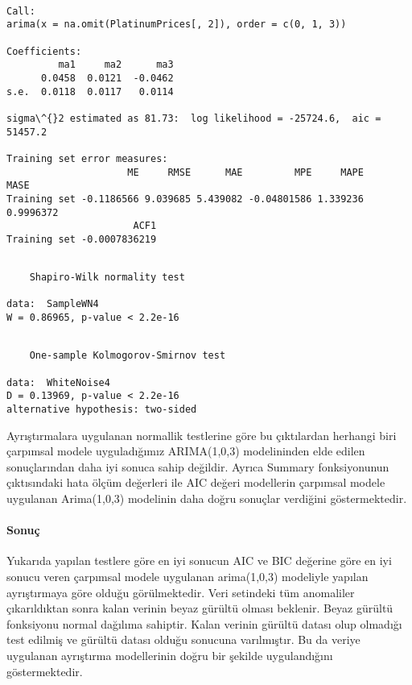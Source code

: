\documentclass[11pt]{article}
\begin{document}
    \begin{Verbatim}[commandchars=\\\{\}]

Call:
arima(x = na.omit(PlatinumPrices[, 2]), order = c(0, 1, 3))

Coefficients:
         ma1     ma2      ma3
      0.0458  0.0121  -0.0462
s.e.  0.0118  0.0117   0.0114

sigma\^{}2 estimated as 81.73:  log likelihood = -25724.6,  aic = 51457.2

Training set error measures:
                     ME     RMSE      MAE         MPE     MAPE      MASE
Training set -0.1186566 9.039685 5.439082 -0.04801586 1.339236 0.9996372
                      ACF1
Training set -0.0007836219

    \end{Verbatim}

    
    \begin{verbatim}

	Shapiro-Wilk normality test

data:  SampleWN4
W = 0.86965, p-value < 2.2e-16

    \end{verbatim}

    
    
    \begin{verbatim}

	One-sample Kolmogorov-Smirnov test

data:  WhiteNoise4
D = 0.13969, p-value < 2.2e-16
alternative hypothesis: two-sided

    \end{verbatim}

    
    Ayrıştırmalara uygulanan normallik testlerine göre bu çıktılardan
herhangi biri çarpımsal modele uyguladığımız ARIMA(1,0,3) modelininden
elde edilen sonuçlarından daha iyi sonuca sahip değildir. Ayrıca Summary
fonksiyonunun çıktısındaki hata ölçüm değerleri ile AIC değeri
modellerin çarpımsal modele uygulanan Arima(1,0,3) modelinin daha doğru
sonuçlar verdiğini göstermektedir.

\paragraph{Sonuç}\label{sonuuxe7}

Yukarıda yapılan testlere göre en iyi sonucun AIC ve BIC değerine göre
en iyi sonucu veren çarpımsal modele uygulanan arima(1,0,3) modeliyle
yapılan ayrıştırmaya göre olduğu görülmektedir. Veri setindeki tüm
anomaliler çıkarıldıktan sonra kalan verinin beyaz gürültü olması
beklenir. Beyaz gürültü fonksiyonu normal dağılıma sahiptir. Kalan
verinin gürültü datası olup olmadığı test edilmiş ve gürültü datası
olduğu sonucuna varılmıştır. Bu da veriye uygulanan ayrıştırma
modellerinin doğru bir şekilde uygulandığını göstermektedir.
\end{document}
